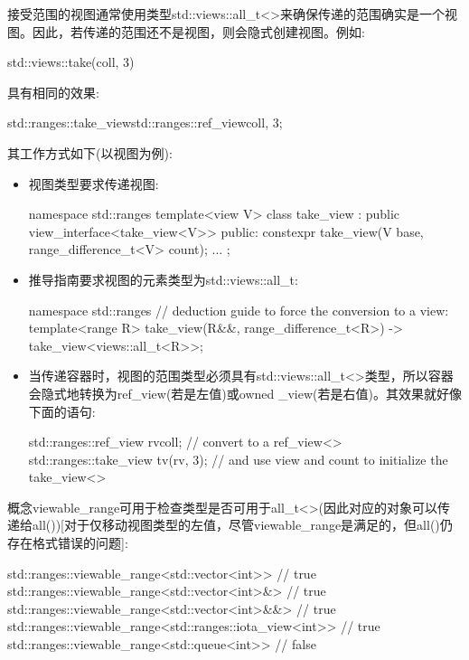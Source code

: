 接受范围的视图通常使用类型std::views::all\_t<>来确保传递的范围确实是一个视图。因此，若传递的范围还不是视图，则会隐式创建视图。例如:

\begin{cpp}
std::views::take(coll, 3)
\end{cpp}

具有相同的效果:

\begin{cpp}
std::ranges::take_view{std::ranges::ref_view{coll}, 3};
\end{cpp}

其工作方式如下(以视图为例):

\begin{itemize}
\item
视图类型要求传递视图:

\begin{cpp}
namespace std::ranges {
	template<view V>
	class take_view : public view_interface<take_view<V>> {
		public:
		constexpr take_view(V base, range_difference_t<V> count);
		...
	};
}
\end{cpp}

\item
推导指南要求视图的元素类型为std::views::all\_t:

\begin{cpp}
namespace std::ranges {
	// deduction guide to force the conversion to a view:
	template<range R>
	take_view(R&&, range_difference_t<R>) -> take_view<views::all_t<R>>;
}
\end{cpp}

\item
当传递容器时，视图的范围类型必须具有std::views::all\_t<>类型，所以容器会隐式地转换为ref\_view(若是左值)或owned \_view(若是右值)。其效果就好像下面的语句:

\begin{cpp}
std::ranges::ref_view rv{coll}; // convert to a ref_view<>
std::ranges::take_view tv(rv, 3); // and use view and count to initialize the take_view<>
\end{cpp}
\end{itemize}

概念viewable\_range可用于检查类型是否可用于all\_t<>(因此对应的对象可以传递给all())[对于仅移动视图类型的左值，尽管viewable\_range是满足的，但all()仍存在格式错误的问题]:

\begin{cpp}
std::ranges::viewable_range<std::vector<int>> // true
std::ranges::viewable_range<std::vector<int>&> // true
std::ranges::viewable_range<std::vector<int>&&> // true
std::ranges::viewable_range<std::ranges::iota_view<int>> // true
std::ranges::viewable_range<std::queue<int>> // false
\end{cpp}

